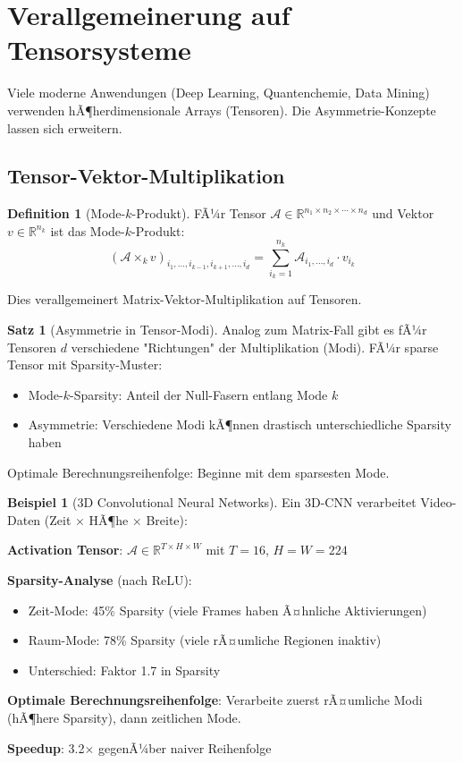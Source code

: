 ﻿\documentclass[a4paper,12pt]{report}
\theoremstyle{definition}
\newtheorem{definition}{Definition}
\newtheorem{beispiel}{Beispiel}
\newtheorem{satz}{Satz}
\begin{document}
	\section{Verallgemeinerung auf Tensorsysteme}
	
	Viele moderne Anwendungen (Deep Learning, Quantenchemie, Data Mining) verwenden hÃ¶herdimensionale Arrays (Tensoren). Die Asymmetrie-Konzepte lassen sich erweitern.
	
	\subsection{Tensor-Vektor-Multiplikation}
	
	\begin{definition}[Mode-$k$-Produkt]
		FÃ¼r Tensor $\mathcal{A} \in \mathbb{R}^{n_1 \times n_2 \times \cdots \times n_d}$ und Vektor $v \in \mathbb{R}^{n_k}$ ist das Mode-$k$-Produkt:
		\[
		(\mathcal{A} \times_k v)_{i_1, \ldots, i_{k-1}, i_{k+1}, \ldots, i_d} = \sum_{i_k=1}^{n_k} \mathcal{A}_{i_1, \ldots, i_d} \cdot v_{i_k}
		\]
		
		Dies verallgemeinert Matrix-Vektor-Multiplikation auf Tensoren.
	\end{definition}
	
	\begin{satz}[Asymmetrie in Tensor-Modi]
		Analog zum Matrix-Fall gibt es fÃ¼r Tensoren $d$ verschiedene "Richtungen" der Multiplikation (Modi). FÃ¼r sparse Tensor mit Sparsity-Muster:
		\begin{itemize}
			\item Mode-$k$-Sparsity: Anteil der Null-Fasern entlang Mode $k$
			\item Asymmetrie: Verschiedene Modi kÃ¶nnen drastisch unterschiedliche Sparsity haben
		\end{itemize}
		
		Optimale Berechnungsreihenfolge: Beginne mit dem sparsesten Mode.
	\end{satz}
	
	\begin{beispiel}[3D Convolutional Neural Networks]
		Ein 3D-CNN verarbeitet Video-Daten (Zeit $\times$ HÃ¶he $\times$ Breite):
		
		\textbf{Activation Tensor}: $\mathcal{A} \in \mathbb{R}^{T \times H \times W}$ mit $T=16$, $H=W=224$
		
		\textbf{Sparsity-Analyse} (nach ReLU):
		\begin{itemize}
			\item Zeit-Mode: 45\% Sparsity (viele Frames haben Ã¤hnliche Aktivierungen)
			\item Raum-Mode: 78\% Sparsity (viele rÃ¤umliche Regionen inaktiv)
			\item Unterschied: Faktor 1.7 in Sparsity
		\end{itemize}
		
		\textbf{Optimale Berechnungsreihenfolge}:
		Verarbeite zuerst rÃ¤umliche Modi (hÃ¶here Sparsity), dann zeitlichen Mode.
		
		\textbf{Speedup}: 3.2$\times$ gegenÃ¼ber naiver Reihenfolge
	\end{beispiel}
	
\end{document}
